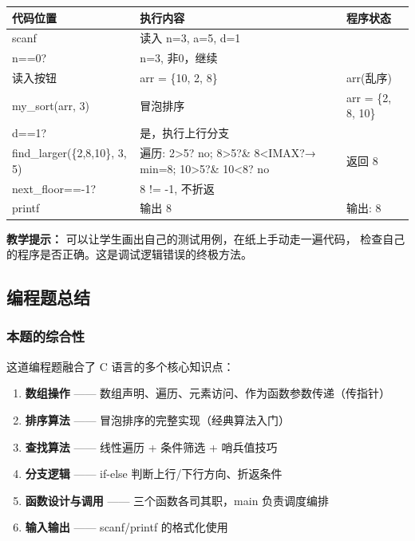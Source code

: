 \begin{center}
\small
\begin{tabular}{@{}p{3cm}p{5cm}p{5cm}@{}}
    \toprule
    \textbf{代码位置}      & \textbf{执行内容}                & \textbf{程序状态}               \\
    \midrule
    scanf                  & 读入 n=3, a=5, d=1           &                                  \\
    n==0?                  & n=3, 非0，继续                  &                                  \\
    读入按钮                  & arr = \{10, 2, 8\}            & arr(乱序)                         \\
    my\_sort(arr, 3)       & 冒泡排序                        & arr = \{2, 8, 10\}               \\
    d==1?                  & 是，执行上行分支                    &                                  \\
    find\_larger(\{2,8,10\}, 3, 5) & 遍历: 2>5? no; 8>5?\& 8<IMAX?\newline → min=8; 10>5?\& 10<8? no & 返回 8                        \\
    next\_floor==-1?       & 8 != -1, 不折返                &                                  \\
    printf                 & 输出 8                        & 输出: 8                           \\
    \bottomrule
\end{tabular}
\end{center}

\textbf{教学提示：} 可以让学生画出自己的测试用例，在纸上手动走一遍代码，
检查自己的程序是否正确。这是调试逻辑错误的终极方法。

\bigskip
\bigskip

\subsection{编程题总结}

\subsubsection{本题的综合性}

这道编程题融合了 C 语言的多个核心知识点：
\begin{enumerate}
    \item \textbf{数组操作} —— 数组声明、遍历、元素访问、作为函数参数传递（传指针）
    \item \textbf{排序算法} —— 冒泡排序的完整实现（经典算法入门）
    \item \textbf{查找算法} —— 线性遍历 + 条件筛选 + 哨兵值技巧
    \item \textbf{分支逻辑} —— if-else 判断上行/下行方向、折返条件
    \item \textbf{函数设计与调用} —— 三个函数各司其职，main 负责调度编排
    \item \textbf{输入输出} —— scanf/printf 的格式化使用
\end{enumerate}

